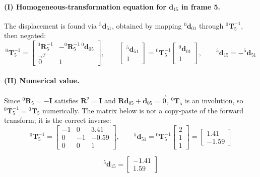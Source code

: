 \documentclass[11pt]{article}
\newcommand{\T}{\bm{T}}
\newcommand{\R}{\bm{R}}
\newcommand{\dvec}{\bm{d}}
\begin{document}
\paragraph{(I) Homogeneous-transformation equation for $\dvec_{15}$ in frame 5.}
The displacement is found via $^{5}\dvec_{51}$, obtained by mapping $^{0}\dvec_{01}$ through $^{0}\T_5^{-1}$, then negated:
\[
    ^{0}\T_5^{-1} = \begin{bmatrix}^{0}\R_5^{-1} & -{}^{0}\R_5^{-1}\,{}^{0}\dvec_{05} \\ \vec 0^{T} & 1\end{bmatrix}, \qquad
    \begin{bmatrix}^{5}\dvec_{51}\\1\end{bmatrix} = {}^{0}\T_5^{-1}\begin{bmatrix}^{0}\dvec_{01}\\1\end{bmatrix}, \qquad {}^{5}\dvec_{15} = -{}^{5}\dvec_{51}
\]

\paragraph{(II) Numerical value.}
Since $^{0}\R_5=-\bm I$ satisfies $\R^2=\bm I$ and $\R\dvec_{05}+\dvec_{05}=\vec 0$, $^{0}\T_5$ is an involution, so $^{0}\T_5^{-1}={}^{0}\T_5$ numerically. The matrix below is not a copy-paste of the forward transform; it is the correct inverse:
\[
    ^{0}\T_5^{-1} = \begin{bmatrix}-1 & 0 & 3.41 \\ 0 & -1 & -0.59 \\ 0 & 0 & 1\end{bmatrix}, \qquad
    ^{5}\dvec_{51} = {}^{0}\T_5^{-1}\begin{bmatrix}2\\1\\1\end{bmatrix} = \begin{bmatrix}1.41\\-1.59\end{bmatrix}
\]
\begin{result}
\[
    ^{5}\dvec_{15} = \begin{bmatrix}-1.41\\1.59\end{bmatrix}
\]
\end{result}

\newpage
\end{document}

